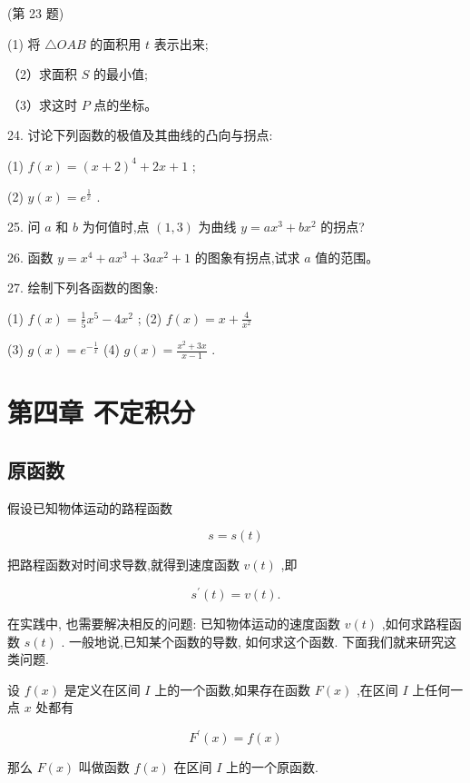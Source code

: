 \documentclass[lang=cn,newtx,10pt,scheme=chinese]{elegantbook}
\begin{document}
(第 23 题)

(1) 将 \(\bigtriangleup {OAB}\) 的面积用 \(t\) 表示出来;

（2）求面积 \(S\) 的最小值;

（3）求这时 \(P\) 点的坐标。

24. 讨论下列函数的极值及其曲线的凸向与拐点:

(1) \(f\left( x\right) = {\left( x + 2\right) }^{4} + {2x} + 1\) ;

(2) \(y\left( x\right) = {e}^{\frac{1}{x}}\) .

25. 问 \(a\) 和 \(b\) 为何值时,点 \(\left( {1,3}\right)\) 为曲线 \(y = a{x}^{3} + b{x}^{2}\) 的拐点?

26. 函数 \(y = {x}^{4} + a{x}^{3} + {3a}{x}^{2} + 1\) 的图象有拐点,试求 \(a\) 值的范围。

27. 绘制下列各函数的图象:

(1) \(f\left( x\right) = \frac{1}{5}{x}^{5} - 4{x}^{2}\) ; (2) \(f\left( x\right) = x + \frac{4}{{x}^{2}}\)

(3) \(g\left( x\right) = {e}^{-\frac{1}{x}}\) (4) \(g\left( x\right) = \frac{{x}^{2} + {3x}}{x - 1}\) .

\chapter{第四章 不定积分}

\section{原函数}

假设已知物体运动的路程函数

\[
s = s\left( t\right)
\]

把路程函数对时间求导数,就得到速度函数 \(v\left( t\right)\) ,即

\[
{s}^{\prime }\left( t\right) = v\left( t\right) \text{.}
\]

在实践中, 也需要解决相反的问题: 已知物体运动的速度函数 \(v\left( t\right)\) ,如何求路程函数 \(s\left( t\right)\) . 一般地说,已知某个函数的导数, 如何求这个函数. 下面我们就来研究这类问题.

设 \(f\left( x\right)\) 是定义在区间 \(I\) 上的一个函数,如果存在函数 \(F\left( x\right)\) ,在区间 \(I\) 上任何一点 \(x\) 处都有

\[
{F}^{\prime }\left( x\right) = f\left( x\right)
\]

那么 \(F\left( x\right)\) 叫做函数 \(f\left( x\right)\) 在区间 \(I\) 上的一个原函数.
\end{document}

